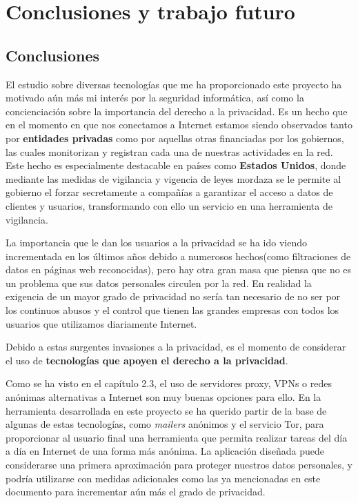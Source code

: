 \chapter{Conclusiones y trabajo futuro}
\label{chap:conclusiones}
\section{Conclusiones}
El estudio sobre diversas tecnologías que me ha proporcionado este proyecto ha motivado aún más mi interés por la seguridad informática, así como la concienciación sobre la importancia del derecho a la privacidad.
Es un hecho que en el momento en que nos conectamos a Internet estamos siendo observados tanto por \textbf{entidades privadas} como por aquellas otras financiadas por los gobiernos, las cuales monitorizan y registran cada una de nuestras actividades en la red. Este hecho es especialmente destacable en países como \textbf{Estados Unidos}, donde mediante las medidas de vigilancia y vigencia de leyes mordaza se le permite al gobierno el forzar secretamente a compañías a garantizar el acceso a datos de clientes y usuarios, transformando con ello un servicio en una herramienta de vigilancia. 

La importancia que le dan los usuarios a la privacidad se ha ido viendo incrementada en los últimos años debido a numerosos hechos(como filtraciones de datos en páginas web reconocidas), pero hay otra gran masa que piensa que no es un problema que sus datos personales circulen por la red. 
En realidad la exigencia de un mayor grado de privacidad no sería tan necesario de no ser por los continuos abusos y el control que tienen las grandes empresas con todos los usuarios que utilizamos diariamente Internet.

Debido a estas surgentes invasiones a la privacidad, es el momento de considerar el uso de \textbf{tecnologías que apoyen el derecho a la privacidad}. 

Como se ha visto en el capítulo 2.3, el uso de servidores proxy, VPNs o redes anónimas alternativas a Internet son muy buenas opciones para ello. En la herramienta desarrollada en este proyecto se ha querido partir de la base de algunas de estas tecnologías, como \textit{mailers }anónimos y el servicio Tor, para proporcionar al usuario final una herramienta que permita realizar tareas del día a día en Internet de una forma más anónima. 
La aplicación diseñada puede considerarse una primera aproximación para proteger nuestros datos personales, y podría utilizarse con medidas adicionales como las ya mencionadas en este documento para incrementar aún más el grado de privacidad.

